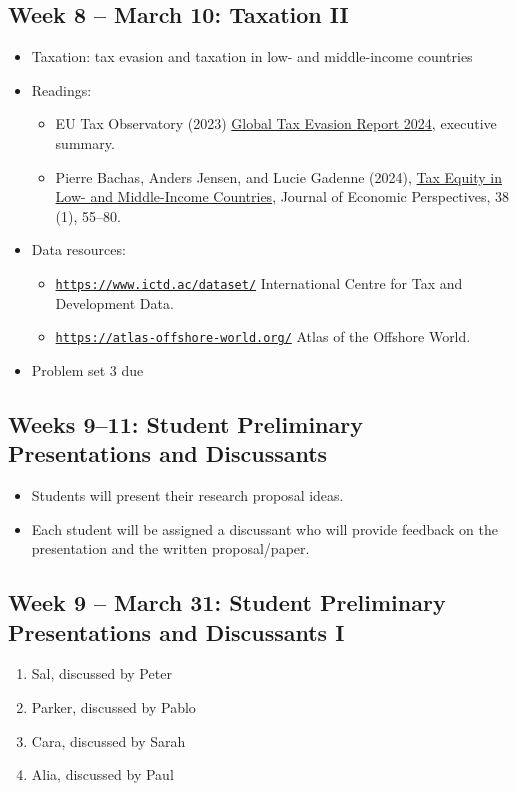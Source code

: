 \documentclass[11pt]{article}
\begin{document}
\subsection*{Week 8 -- March 10: Taxation II}
\begin{itemize}
    \setlength{\itemsep}{0em}
    \item Taxation: tax evasion and taxation in low- and middle-income countries
    \item Readings:
    \begin{itemize}
        \item EU Tax Observatory (2023) \href{https://www.taxobservatory.eu//www-site/uploads/2023/10/report.pdf}{Global Tax Evasion Report 2024}, executive summary.
        \item Pierre Bachas, Anders Jensen, and Lucie Gadenne (2024), \href{https://www.aeaweb.org/articles?id=10.1257/jep.38.1.55}{Tax Equity in Low- and Middle-Income Countries}, Journal of Economic Perspectives, 38 (1), 55--80.
    \end{itemize}
    \item Data resources:
    \begin{itemize}
        \item \href{https://www.ictd.ac/dataset/}{\nolinkurl{https://www.ictd.ac/dataset/}} International Centre for Tax and Development Data.
        \item \href{https://atlas-offshore-world.org/}{\nolinkurl{https://atlas-offshore-world.org/}} Atlas of the Offshore World.
    \end{itemize}
    \item Problem set 3 due
\end{itemize}

\subsection*{Weeks 9--11: Student Preliminary Presentations and Discussants}
\begin{itemize}
    \setlength{\itemsep}{0em}
    \item Students will present their research proposal ideas.
    \item Each student will be assigned a discussant who will provide feedback on the presentation and the written proposal/paper.
\end{itemize}

\subsection*{Week 9 -- March 31: Student Preliminary Presentations and Discussants I}
\begin{enumerate}
    \setlength{\itemsep}{0em}
    \item Sal, discussed by Peter
    \item Parker, discussed by Pablo
    \item Cara, discussed by Sarah
    \item Alia, discussed by Paul
\end{enumerate}
\end{document}
